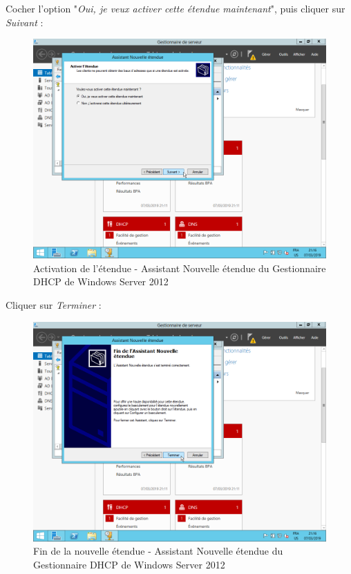\newpage
Cocher l'option "\textit{Oui, je veux activer cette étendue maintenant}", puis cliquer sur \textit{Suivant} :
\begin{figure}[h!]
    \begin{center}
        \includegraphics[scale=0.6]{WS2012_Screenshots/51.png}
        \caption{Activation de l'étendue - Assistant Nouvelle étendue du Gestionnaire DHCP de Windows Server 2012}
        \label{WS2012_Screenshots/51}
    \end{center}
\end{figure}
\FloatBarrier

\newpage
Cliquer sur \textit{Terminer} :
\begin{figure}[h!]
    \begin{center}
        \includegraphics[scale=0.6]{WS2012_Screenshots/52.png}
        \caption{Fin de la nouvelle étendue - Assistant Nouvelle étendue du Gestionnaire DHCP de Windows Server 2012}
        \label{WS2012_Screenshots/52}
    \end{center}
\end{figure}
\FloatBarrier


